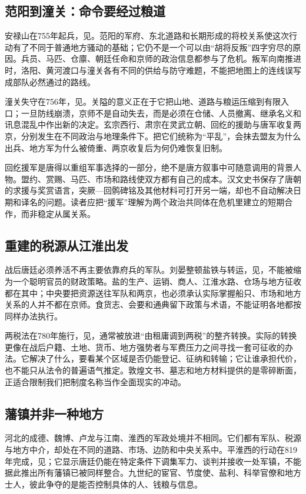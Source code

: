 \subsection{范阳到潼关：命令要经过粮道}
安禄山在755年起兵，见。范阳的军府、东北道路和长期形成的将校关系使这次行动有了不同于普通地方骚动的基础；它仍不是一个可以由“胡将反叛”四字穷尽的原因。兵员、马匹、仓廪、朝廷任命和京师的政治信息都参与了危机。叛军向南推进时，洛阳、黄河渡口与潼关各有不同的供给与防守难题，不能把地图上的连线误写成部队必然通过的路线。

潼关失守在756年，见。关隘的意义正在于它把山地、道路与粮运压缩到有限入口；一旦防线崩溃，京师不是自动失去，而是必须在仓储、人员撤离、继承名义和讯息混乱中作出新的决定。玄宗西行、肃宗在灵武立朝、回纥的援助与唐军收复两京，分别发生在不同政治与地理条件下。把它们统称为“平乱”，会抹去盟友为什么出兵、地方军为什么被倚重、两京收复后为何仍难恢复旧制。

回纥援军是唐得以重组军事选择的一部分，绝不是唐方叙事中可随意调用的背景人物。盟约、赏赐、马匹、市场和路线使双方都有自己的成本。汉文史书保存了唐朝的求援与奖赏语言，突厥—回鹘碑铭及其他材料可打开另一端，却也不自动解决日期和译名的问题。读者应把“援军”理解为两个政治共同体在危机里建立的短期合作，而非稳定从属关系。

\subsection{重建的税源从江淮出发}
战后唐廷必须养活不再主要依靠府兵的军队。刘晏整顿盐铁与转运，见，不能被缩为一个聪明官员的财政策略。盐的生产、运销、商人、江淮水路、仓场与地方征收都在其中；中央要把资源送往军队和两京，也必须承认实际掌握船只、市场和地方关系的人并不都在京师。食货志、会要和通典留下政策与术语，不能证明各地都按同样办法执行。

两税法在780年施行，见，通常被放进“由租庸调到两税”的整齐转换。实际的转换更像在战后户籍、土地、货币、地方强势者与军费压力之间寻找一套可征收的办法。它解决了什么，要看某个区域是否仍能登记、征纳和转输；它让谁承担代价，也不能只从法令的普遍语气推定。敦煌文书、墓志和地方材料提供的是零碎断面，正适合限制我们把制度名称当作全面现实的冲动。

\subsection{藩镇并非一种地方}
河北的成德、魏博、卢龙与江南、淮西的军政处境并不相同。它们都有军队、税源与地方中介，却处在不同的道路、市场、边防和中央关系中。平淮西的行动在819年完成，见；它显示唐廷仍能在特定条件下调集军力、谈判并接收一处军镇，不能据此推出所有藩镇已被同样整合。九世纪的宦官、节度使、盐利、科举官僚和地方士人，彼此争夺的是能否控制具体的人、钱粮与信息。

